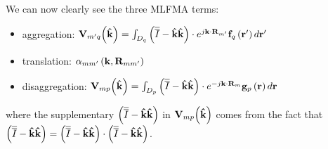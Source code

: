 We can now clearly see the three MLFMA terms:
\begin{itemize}
\item aggregation: $\mathbf{V}_{m'q} \! \left(\mathbf{\hat{k}}\right) = \int_{D_q} \left( \overline{\overline{I}}-\mathbf{\hat{k}}\mathbf{\hat{k}} \right) \cdot e^{j\mathbf{k} \cdot \mathbf{R}_{m'}} \mathbf{f}_q\left(\mathbf{r}'\right) d \mathbf{r}'$
\item translation: $\alpha_{mm'}\left(\mathbf{k}, \mathbf{R}_{mm'} \right)$
\item disaggregation: $\mathbf{V}_{mp} \! \left(\mathbf{\hat{k}}\right) = \int_{D_p} \left( \overline{\overline{I}}-\mathbf{\hat{k}}\mathbf{\hat{k}} \right) \cdot e^{-j\mathbf{k} \cdot \mathbf{R}_{m}} \mathbf{g}_p\left(\mathbf{r}\right) d \mathbf{r}$
\end{itemize}
where the supplementary $\left(\overline{\overline{I}}-\mathbf{\hat{k}}\mathbf{\hat{k}} \right)$ in $\mathbf{V}_{mp} \! \left(\mathbf{\hat{k}}\right)$ comes from the fact that $\left(\overline{\overline{I}}-\mathbf{\hat{k}}\mathbf{\hat{k}} \right) = \left(\overline{\overline{I}}-\mathbf{\hat{k}}\mathbf{\hat{k}} \right) \cdot \left(\overline{\overline{I}}-\mathbf{\hat{k}}\mathbf{\hat{k}} \right)$.

